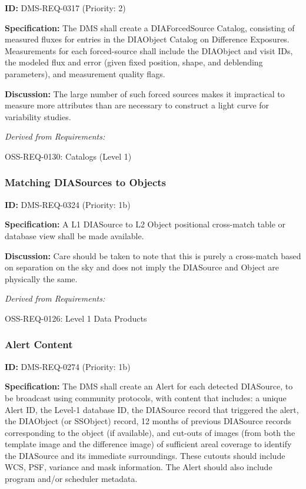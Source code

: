 \documentclass[SE,toc,lsstdraft]{lsstdoc}
\begin{document}
\label{DMS-REQ-0317}
\textbf{ID:} DMS-REQ-0317 (Priority: 2)

\textbf{Specification:} The DMS shall create a DIAForcedSource Catalog, consisting of measured fluxes for entries in the DIAObject Catalog on Difference Exposures. Measurements for each forced-source shall include the DIAObject and visit IDs, the modeled flux and error (given fixed position, shape, and deblending parameters), and measurement quality flags.

\textbf{Discussion: }The large number of such forced sources makes it impractical to measure more attributes than are necessary to construct a light curve for variability studies.

\emph{Derived from Requirements:}

OSS-REQ-0130:
Catalogs (Level 1) \newline

\subsubsection{Matching DIASources to Objects}

\label{DMS-REQ-0324}
\textbf{ID:} DMS-REQ-0324 (Priority: 1b)

\textbf{Specification:} A L1 DIASource to L2 Object positional cross-match table or database view shall be made available.

\textbf{Discussion:} Care should be taken to note that this is purely a cross-match based on separation on the sky and does not imply the DIASource and Object are physically the same.

\emph{Derived from Requirements:}

OSS-REQ-0126:
Level 1 Data Products \newline

\subsubsection{Alert Content}

\label{DMS-REQ-0274}
\textbf{ID:} DMS-REQ-0274 (Priority: 1b)

\textbf{Specification:}
    The DMS shall create an Alert for each detected DIASource, to be broadcast using community protocols, with content that includes: a unique Alert ID, the Level-1 database ID, the DIASource record that triggered the alert, the DIAObject (or SSObject) record, 12 months of previous DIASource records corresponding to the object (if available), and cut-outs of images (from both the template image and the difference image) of sufficient areal coverage to identify the DIASource and its immediate surroundings. These cutouts should include WCS, PSF, variance and mask information. The Alert should also include program and/or scheduler metadata.
\end{document}
